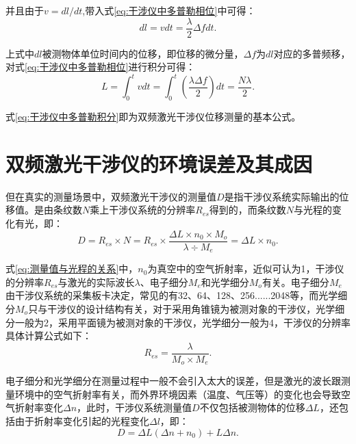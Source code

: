 并且由于\(v=dl / dt\),带入式\eqref{eq:干涉仪中多普勒相位}中可得：
\begin{equation}\label{eq:干涉仪中多普勒位移微分}
  dl = vdt = \frac{\lambda}{2}\Delta f dt.
\end{equation}

上式中\(dl\)被测物体单位时间内的位移，即位移的微分量，\(\Delta f\)为\(dl\)对应的多普频移，对式\eqref{eq:干涉仪中多普勒相位}进行积分可得：
\begin{equation}\label{eq:干涉仪中多普勒积分}
  L = \int_{0}^{t} vdt =\int_{0}^{t} (\frac{\lambda \Delta f}{2})dt = \frac{N\lambda}{2}.
\end{equation}

式\eqref{eq:干涉仪中多普勒积分}即为双频激光干涉仪位移测量的基本公式\cite{丁子婷双频激光干涉仪测量系统的环境误差研究}。

\section{双频激光干涉仪的环境误差及其成因}
但在真实的测量场景中，双频激光干涉仪的测量值\(D\)是指干涉仪系统实际输出的位移值。是由条纹数\(N\)乘上干涉仪系统的分辨率\(R_{es}\)得到的，而条纹数\(N\)与光程的变化有光，即：
\begin{equation}\label{eq:测量值与光程的关系}
    D=R_{es}{\times}N=R_{es}{\times}\frac{\Delta L{\times}n_0{\times}M_o}{\lambda{\div}M_e}=\Delta L{\times}n_0.
\end{equation}

式\eqref{eq:测量值与光程的关系}中，\(n_0\)为真空中的空气折射率，近似可认为1，干涉仪的分辨率\(R_{es}\)与激光的实际波长\(\lambda\)、电子细分\(M_e\)和光学细分\(M_o\)有关。电子细分\(M_e\)由干涉仪系统的采集板卡决定，常见的有32、64、128、256......2048等，而光学细分\(M_o\)只与干涉仪的设计结构有关，对于采用角锥镜为被测对象的干涉仪，光学细分一般为2，采用平面镜为被测对象的干涉仪，光学细分一般为4，干涉仪的分辨率具体计算公式如下：
\begin{equation}\label{eq:分辨率与细分的关系}
    R_{es}=\frac{\lambda}{M_o{\times}M_e}.
\end{equation}

电子细分和光学细分在测量过程中一般不会引入太大的误差，但是激光的波长跟测量环境中的空气折射率有关，而外界环境因素（温度、气压等）的变化也会导致空气折射率变化\(\Delta n\)，此时，干涉仪系统测量值\(D\)不仅包括被测物体的位移\(\Delta L\)，还包括由于折射率变化引起的光程变化\(\Delta l\)，即：
\begin{equation}\label{eq:实际的位移公式}
    D=\Delta L(\Delta n+n_0)+L\Delta n.
\end{equation}

